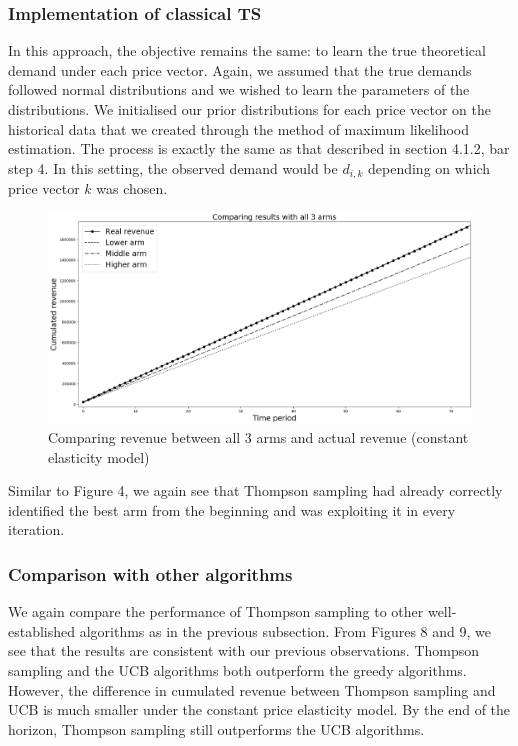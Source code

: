 \documentclass[a4paper]{article}
\begin{document}
\subsubsection{Implementation of classical TS}
In this approach, the objective remains the same: to learn the true theoretical demand under each price vector. Again, we assumed that the true demands followed normal distributions and we wished to learn the parameters of the distributions. We initialised our prior distributions for each price vector on the historical data that we created through the method of maximum likelihood estimation.
\newline
\newline
The process is exactly the same as that described in section 4.1.2, bar step 4. In this setting, the observed demand would be $d_{i,k}$ depending on which price vector $k$ was chosen.
\begin{figure}[h!]
	\centering
	\includegraphics[width=1.03\textwidth]{7.png}
	\caption{\label{fig:7}Comparing revenue between all 3 arms and actual revenue (constant elasticity model)}
\end{figure}
\newline
Similar to Figure 4, we again see that Thompson sampling had already correctly identified the best arm from the beginning and was exploiting it in every iteration.

\subsubsection{Comparison with other algorithms}
We again compare the performance of Thompson sampling to other well-established algorithms as in the previous subsection. From Figures 8 and 9, we see that the results are consistent with our previous observations. Thompson sampling and the UCB algorithms both outperform the greedy algorithms. However, the difference in cumulated revenue between Thompson sampling and UCB is much smaller under the constant price elasticity model. By the end of the horizon, Thompson sampling still outperforms the UCB algorithms.
\end{document}
